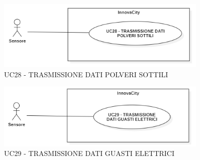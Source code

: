 
\begin{figure}[H]
    \centering
    \includegraphics[width=0.9\textwidth]{../Images/uc28.PNG}
    \caption{UC28 - TRASMISSIONE DATI POLVERI SOTTILI}
\end{figure}



\begin{figure}[H]
    \centering
    \includegraphics[width=0.9\textwidth]{../Images/uc29.PNG}
    \caption{UC29 - TRASMISSIONE DATI GUASTI ELETTRICI}
\end{figure}


\setcounter{rowcounter}{1}
